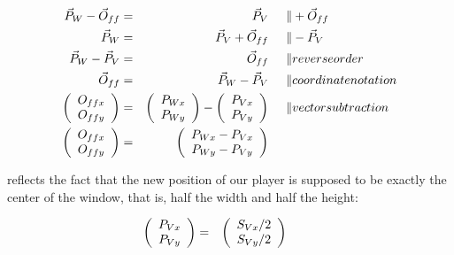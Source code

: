\begin{align}
	\vec{P}_W - \vec{O}_{ff}  &=& \vec{P}_V                   &\hspace{0.5cm}\| + \vec{O}_{ff}\label{off00}\\
	\vec{P}_W                 &=& \vec{P}_V  + \vec{O}_{ff}   &\hspace{0.5cm}\| - \vec{P}_{V}\nonumber\\
	\vec{P}_W - \vec{P}_V     &=& \vec{O}_{ff}                &\hspace{0.5cm}\| reverse order\nonumber\\
	\vec{O}_{ff}              &=& \vec{P}_W - \vec{P}_V       &\hspace{0.5cm}\| coordinate notation\nonumber\\
	\left(\begin{array}{c} O_{ffx} \\ O_{ffy} \end{array}\right) &=& \left(\begin{array}{c} P_{Wx} \\ P_{Wy} \end{array}\right)  - \left(\begin{array}{c} P_{Vx} \\ P_{Vy} \end{array}\right) &\hspace{0.5cm}\| vector subtraction\nonumber\\
	\left(\begin{array}{c} O_{ffx} \\ O_{ffy} \end{array}\right) &=& \left(\begin{array}{c} P_{Wx} - P_{Vx}\\  P_{Wy} - P_{Vy}\end{array}\right)&\hspace{0.5cm}\label{off01}
\end{align}

 reflects the fact that the new position of our player is supposed to be exactly the center of the window, that is, half the width and half the height:

\begin{align}
	\left(\begin{array}{c} P_{Vx}  \\ P_{Vy}  \end{array}\right) &=& \left(\begin{array}{c} S_{Vx} / 2\\ S_{Vy} / 2 \end{array}\right) & \hspace{0.5cm}\label{off02}
\end{align}

